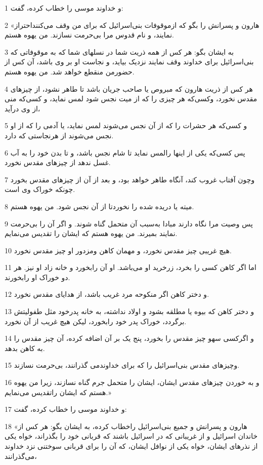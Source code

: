 \par 1 و خداوند موسی را خطاب کرده، گفت:
\par 2 «هارون و پسرانش را بگو که ازموقوفات بنی‌اسرائیل که برای من وقف می‌کننداحتراز نمایند، و نام قدوس مرا بی‌حرمت نسازند. من یهوه هستم.
\par 3 به ایشان بگو: هر کس از همه ذریت شما در نسلهای شما که به موقوفاتی که بنی‌اسرائیل برای خداوند وقف نمایند نزدیک بیاید، و نجاست او بر وی باشد، آن کس از حضورمن منقطع خواهد شد. من یهوه هستم.
\par 4 هر کس از ذریت هارون که مبروص یا صاحب جریان باشد تا طاهر نشود، از چیزهای مقدس نخورد، وکسی‌که هر چیزی را که از میت نجس شود لمس نماید، و کسی‌که منی از وی درآید،
\par 5 و کسی‌که هر حشرات را که از آن نجس می‌شوند لمس نماید، یا آدمی را که از او نجس می‌شوند از هرنجاستی که دارد.
\par 6 پس کسی‌که یکی از اینها رالمس نماید تا شام نجس باشد، و تا بدن خود را به آب غسل ندهد از چیزهای مقدس نخورد.
\par 7 وچون آفتاب غروب کند، آنگاه طاهر خواهد بود، و بعد از آن از چیزهای مقدس بخورد چونکه خوراک وی است.
\par 8 میته یا دریده شده را نخوردتا از آن نجس شود. من یهوه هستم.
\par 9 پس وصیت مرا نگاه دارند مبادا به‌سبب آن متحمل گناه شوند. و اگر آن را بی‌حرمت نمایند بمیرند. من یهوه هستم که ایشان را تقدیس می‌نمایم.
\par 10 هیچ غریبی چیز مقدس نخورد، و مهمان کاهن ومزدور او چیز مقدس نخورد.
\par 11 اما اگر کاهن کسی را بخرد، زرخرید او می‌باشد. او آن رابخورد و خانه زاد او نیز. هر دو خوراک او رابخورند.
\par 12 و دختر کاهن اگر منکوحه مرد غریب باشد، از هدایای مقدس نخورد.
\par 13 و دختر کاهن که بیوه یا مطلقه بشود و اولاد نداشته، به خانه پدرخود مثل طفولیتش برگردد، خوراک پدر خود رابخورد، لیکن هیچ غریب از آن نخورد.
\par 14 و اگرکسی سهو چیز مقدس را بخورد، پنج یک بر آن اضافه کرده، آن چیز مقدس را به کاهن بدهد.
\par 15 وچیزهای مقدس بنی‌اسرائیل را که برای خداوندمی گذرانند، بی‌حرمت نسازند.
\par 16 و به خوردن چیزهای مقدس ایشان، ایشان را متحمل جرم گناه نسازند، زیرا من یهوه هستم که ایشان راتقدیس می‌نمایم.»
\par 17 و خداوند موسی را خطاب کرده، گفت:
\par 18 «هارون و پسرانش و جمیع بنی‌اسرائیل راخطاب کرده، به ایشان بگو: هر کس از خاندان اسرائیل و از غریبانی که در اسرائیل باشند که قربانی خود را بگذراند، خواه یکی از نذرهای ایشان، خواه یکی از نوافل ایشان، که آن را برای قربانی سوختنی نزد خداوند می‌گذرانند،
